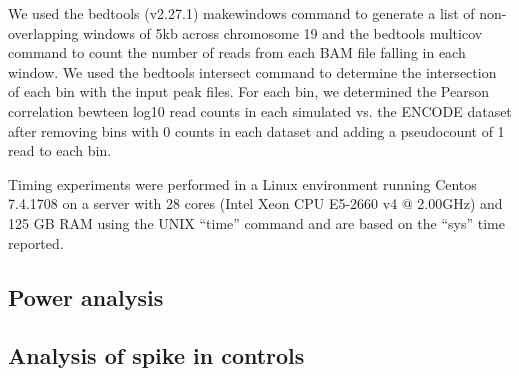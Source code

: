 \documentclass[12pt]{article}
\begin{document}
We used the bedtools \cite{bedtools} (v2.27.1) makewindows command to generate a list of non-overlapping windows of 5kb across chromosome 19 and the bedtools multicov command to count the number of reads from each BAM file falling in each window. We used the bedtools intersect command to determine the intersection of each bin with the input peak files. For each bin, we determined the Pearson correlation bewteen log10 read counts in each simulated vs. the ENCODE dataset after removing bins with 0 counts in each dataset and adding a pseudocount of 1 read to each bin.

Timing experiments were performed in a Linux environment running Centos 7.4.1708 on a server with 28 cores (Intel\textsuperscript{\textregistered} Xeon\textsuperscript{\textregistered} CPU E5-2660 v4 @ 2.00GHz) and 125 GB RAM using the UNIX ``time'' command and are based on the ``sys'' time reported. %


\subsection*{Power analysis}

\subsection*{Analysis of spike in controls}



\end{document}
